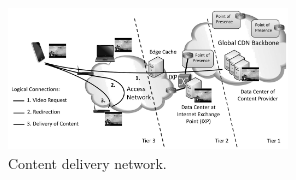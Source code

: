 





\begin{figure}[bt]
\centering
	\includegraphics[width=0.66\textwidth]{aslevel/figs/cdn}
	\vspace{-0.2cm}
 	\caption{Content delivery network.}
 	\label{fig:aslevel:cdn}
\end{figure}


